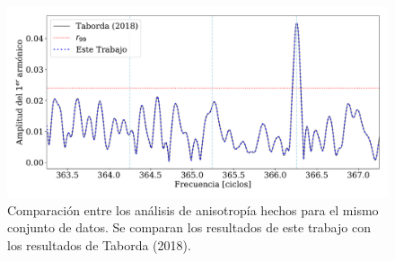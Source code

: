       \begin{figure}[H]
        \centering
        \includegraphics[width=0.75\linewidth]{sin_pesos_referencia_8_EeV.pdf}
        \caption{Comparación entre los análisis de anisotropía hechos para el mismo conjunto de datos. Se comparan los resultados de este trabajo con los resultados de Taborda (2018).}
        \label{fig:sin_pesos_referencia}
      \end{figure}
